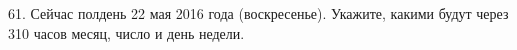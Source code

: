 61. Сейчас полдень 22 мая 2016 года (воскресенье). Укажите, какими будут через 310 часов месяц, число и день недели.\\
